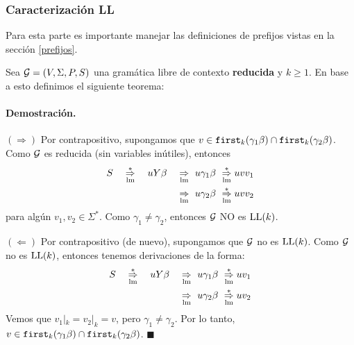     \subsubsection{Caracterización LL}
    Para esta parte es importante manejar las definiciones de prefijos vistas en la sección \ref{prefijos}. \medbreak

    Sea $\mathcal{G} = (V,\Sigma,P,S)$ una gramática libre de contexto \textbf{reducida} y $k \ge 1$. En base a esto definimos el siguiente teorema:


    \paragraph{Demostración.} $(\Rightarrow)$ Por contrapositivo, supongamos que $v\in \texttt{first}_k(\gamma_1 \beta) \cap \texttt{first}_k(\gamma_2 \beta)$. Como $\mathcal{G}$ es reducida (sin variables inútiles), entonces
    \begin{align*}
        S \quad \overunder{\Rightarrow}{\mathrm{lm}}{*} \quad u Y \beta \quad & \overunder{\Rightarrow}{\mathrm{lm}}{}\ u \gamma_1 \beta \ \overunder{\Rightarrow}{\mathrm{lm}}{*} u v v_1 \\
                                                                              & \overunder{\Rightarrow}{\mathrm{lm}}{}\ u \gamma_2 \beta \ \overunder{\Rightarrow}{\mathrm{lm}}{*} u v v_2
    \end{align*}
    para algún $v_1,v_2 \in \Sigma^*$. Como $\gamma_1 \neq \gamma_2$, entonces $\mathcal{G}$ NO es $\text{LL}(k)$. \medbreak

$(\Leftarrow)$ Por contrapositivo (de nuevo), supongamos que $\mathcal{G}$ no es $\text{LL}(k)$. Como $\mathcal{G}$ no es $\text{LL}(k)$, entonces tenemos derivaciones de la forma:
    \begin{align*}
        S \quad \overunder{\Rightarrow}{\mathrm{lm}}{*} \quad u Y \beta \quad & \overunder{\Rightarrow}{\mathrm{lm}}{}\ u \gamma_1 \beta \ \overunder{\Rightarrow}{\mathrm{lm}}{*} u v_1 \\
                                                                              & \overunder{\Rightarrow}{\mathrm{lm}}{}\ u \gamma_2 \beta \ \overunder{\Rightarrow}{\mathrm{lm}}{*} u v_2
    \end{align*}
    Vemos que $v_1|_k = v_2|_k = v$, pero $\gamma_1 \neq \gamma_2$. Por lo tanto, $v \in \texttt{first}_k(\gamma_1 \beta) \cap \texttt{first}_k(\gamma_2 \beta)$. \hfill $\blacksquare$ \bigbreak

